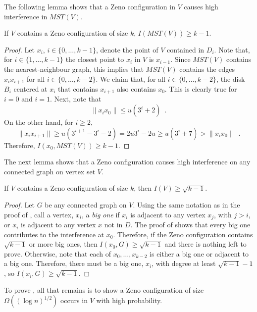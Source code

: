 \documentclass{patmorin}
\newcommand{\mst}{\mathit{MST}}
\begin{document}
The following lemma shows that a Zeno configuration in $V$ causes high
interference in $\mst(V)$.

\begin{lem}
If $V$ contains a Zeno configuration of size $k$, $I(\mst(V))\ge k-1$.
\end{lem}

\begin{proof}
Let $x_i$, $i\in\{0,\ldots,k-1\}$, denote the point of $V$ contained in
$D_i$.  Note that, for $i\in\{1,\ldots,k-1\}$ the closest point to $x_i$ in
$V$ is $x_{i-1}$.  Since $\mst(V)$ contains the nearest-neighbour graph, this
implies that $\mst(V)$ contains the edges $x_ix_{i+1}$ for all
$i\in\{0,\ldots,k-2\}$.  We claim that, for all $i\in\{0,\ldots,k-2\}$, the disk $B_i$ centered at $x_i$
that contains $x_{i+1}$ also contains $x_0$.  This is clearly true for
$i=0$ and $i=1$.  Next, note that
\[
  \|x_ix_0\| \le u(3^i+2) \enspace .
\]
On the other hand, for $i\ge 2$,
\[
  \|x_ix_{i+1}\| \ge u(3^{i+1}-3^i-2) = 2u3^i-2u \ge u(3^i + 7) > 
\|x_ix_0\| \enspace .
\]
Therefore, $I(x_0,\mst(V)) \ge k-1$.
\end{proof}

The next lemma shows that a Zeno configuration causes high interference on
any connected graph on vertex set $V$.

\begin{lem}
If $V$ contains a Zeno configuration of size $k$, then $I(V)\ge\sqrt{k-1}$.
\end{lem}

\begin{proof}
Let $G$ be any connected graph on $V$.  Using the same notation as
in the proof of , call a vertex, $x_i$, a \emph{big
one} if $x_i$ is adjacent to any vertex $x_j$, with $j>i$, or $x_i$ is
adjacent to any vertex $x$ not in $D$.  The proof of 
shows that every big one contributes to the interference at $x_0$.
Therefore, if the Zeno configuration contains $\sqrt{k-1}$ or more big
ones, then $I(x_0,G)\ge\sqrt{k-1}$ and there is nothing left to prove.
Otherwise, note that each of $x_0,\ldots,x_{k-2}$ is either a big one
or adjacent to a big one. Therefore, there must be a big one, $x_i$,
with degree at least $\sqrt{k-1}-1$, so $I(x_i,G)\ge\sqrt{k-1}$.
\end{proof}

To prove , all that remains is to show a Zeno
configuration of size $\Omega((\log n)^{1/2})$ occurs in $V$ with high
probability.
\end{document}
